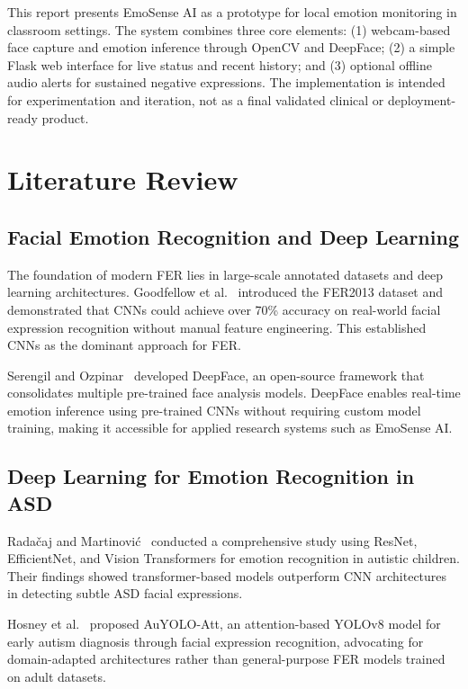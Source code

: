 \documentclass[conference]{IEEEtran}
\begin{document}
This report presents EmoSense AI as a prototype for local
emotion monitoring in classroom settings. The system combines
three core elements: (1) webcam-based face capture and emotion
inference through OpenCV and DeepFace; (2) a simple Flask web
interface for live status and recent history; and (3) optional
offline audio alerts for sustained negative expressions. The
implementation is intended for experimentation and iteration,
not as a final validated clinical or deployment-ready product.

\section{Literature Review}

\subsection{Facial Emotion Recognition and Deep Learning}

The foundation of modern FER lies in large-scale annotated
datasets and deep learning architectures. Goodfellow et
al.~\cite{goodfellow2013} introduced the FER2013 dataset
and demonstrated that CNNs could achieve over 70\% accuracy
on real-world facial expression recognition without manual
feature engineering. This established CNNs as the dominant
approach for FER.

Serengil and Ozpinar~\cite{serengil2020} developed DeepFace,
an open-source framework that consolidates multiple pre-trained
face analysis models. DeepFace enables real-time emotion
inference using pre-trained CNNs without requiring custom
model training, making it accessible for applied research
systems such as EmoSense AI.

\subsection{Deep Learning for Emotion Recognition in ASD}

Rada\v{c}aj and Martinovi\'{c}~\cite{radocaj2025} conducted
a comprehensive study using ResNet, EfficientNet, and Vision
Transformers for emotion recognition in autistic children.
Their findings showed transformer-based models outperform
CNN architectures in detecting subtle ASD facial expressions.

Hosney et al.~\cite{hosney2024} proposed AuYOLO-Att, an
attention-based YOLOv8 model for early autism diagnosis
through facial expression recognition, advocating for
domain-adapted architectures rather than general-purpose
FER models trained on adult datasets.
\end{document}
